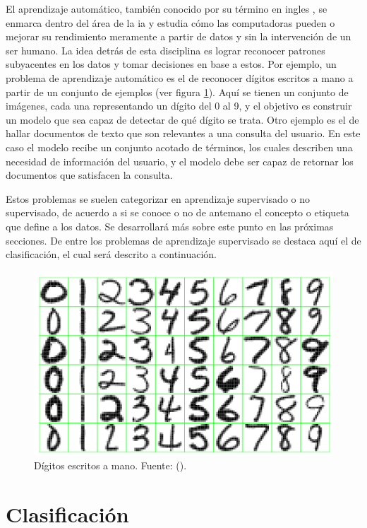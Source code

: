 El aprendizaje automático, también conocido por su término en ingles
, se enmarca dentro del área de la
\acrfull{ia} y estudia cómo las computadoras pueden  o
mejorar su rendimiento meramente a partir de datos y sin la intervención de un
ser humano.  La idea detrás de esta disciplina es lograr reconocer patrones
subyacentes en los datos y tomar decisiones en base a estos. Por ejemplo, un
problema de aprendizaje automático es el de reconocer dígitos escritos a mano a
partir de un conjunto de ejemplos (ver figura \ref{fig:reconocimiento_digitos}).
Aquí se tienen un conjunto de imágenes, cada una representando un dígito del 0
al 9, y el objetivo es construir un modelo que sea capaz de detectar de qué
dígito se trata. Otro ejemplo es el de hallar documentos de texto que son
relevantes a una consulta del usuario. En este caso el modelo recibe un conjunto
acotado de términos, los cuales describen una necesidad de información del
usuario, y el modelo debe ser capaz de retornar los documentos que satisfacen la
consulta.  

Estos problemas se suelen categorizar en aprendizaje supervisado o no
supervisado, de acuerdo a si se conoce o no de antemano el concepto o etiqueta
que define a los datos. Se desarrollará más sobre este punto en las próximas
secciones. De
entre los problemas de aprendizaje supervisado se destaca aquí el de
clasificación, el cual será descrito a continuación.

\begin{figure}
   \includegraphics[width=0.66\linewidth]{figures/digits_recognition_v2.png}
   \centering
   \caption{Dígitos escritos a mano. Fuente: 
   (\citeyear{hastie_elements_2009}).}
   \label{fig:reconocimiento_digitos}
\end{figure}

\section{Clasificación}

